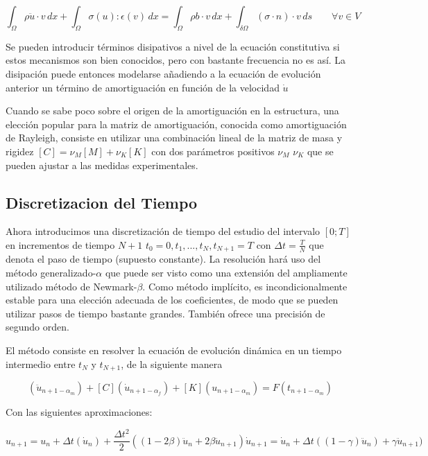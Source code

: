 \documentclass[12pt, a4paper]{article}
\begin{document}
\begin{equation}
	\int_{\Omega} \rho \ddot{u} \cdot v \,dx + \int_{\Omega} \sigma(u):\epsilon(v) \, dx = \int_{\Omega} \rho b \cdot v \, dx + \int_{\delta \Omega} (\sigma \cdot n) \cdot v \, ds \quad \quad \forall v \in V
	\label{equ:defelas-com}
\end{equation}

Se pueden introducir términos disipativos a nivel de la ecuación constitutiva si estos mecanismos son bien conocidos, pero con bastante frecuencia no es así. La disipación puede entonces modelarse añadiendo a la ecuación de evolución anterior un término de amortiguación en función de la velocidad $ \dot{u} $

Cuando se sabe poco sobre el origen de la amortiguación en la estructura, una elección popular para la matriz de amortiguación, conocida como amortiguación de Rayleigh, consiste en utilizar una combinación lineal de la matriz de masa y rigidez $[C]= \nu_M [M]+ \nu_K [K]$ con dos parámetros positivos $\nu_M$ $\nu_K$ que se pueden ajustar a las medidas experimentales.

\subsection{Discretizacion del Tiempo}

Ahora introducimos una discretización de tiempo del estudio del intervalo $[0;T]$ en incrementos de tiempo $N+1$ $t_0=0,t_1,...,t_N,t_{N+1}=T$ con $\Delta t=\frac{T}{N}$ que denota el paso de tiempo (supuesto constante). La resolución hará uso del método generalizado-$\alpha$ que puede ser visto como una extensión del ampliamente utilizado método de Newmark-$\beta$. Como método implícito, es incondicionalmente estable para una elección adecuada de los coeficientes, de modo que se pueden utilizar pasos de tiempo bastante grandes. También ofrece una precisión de segundo orden.

El método consiste en resolver la ecuación de evolución dinámica en un tiempo intermedio entre $t_N$ y $t_{N+1}$, de la siguiente manera

\begin{equation}
	[M](\ddot{u}_{n+1-\alpha_m})+[C](\dot{u}_{n+1-\alpha_f})+[K](u_{n+1-\alpha_m})=F(t_{n+1-\alpha_m})
\end{equation}

Con las siguientes aproximaciones:

\begin{equation}
	u_{n+1} = u_n + \Delta t(\dot{u}_n) + \frac{\Delta t^2}{2}((1-2\beta)\ddot{u}_n + 2 \beta \ddot{u}_{n+1})
	\dot{u}_{n+1} = \dot{u}_n + \Delta t((1- \gamma )\ddot{u}_n) + \gamma \ddot{u}_{n+1})
\end{equation}
\end{document}
